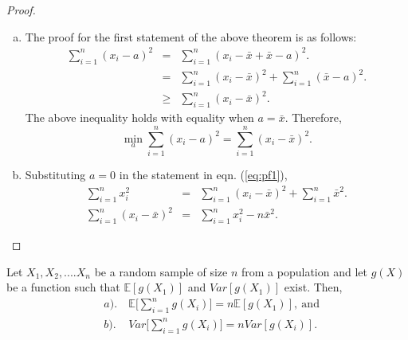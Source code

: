 \documentclass[a4paper,english,12pt]{article}
\begin{document}
\begin{proof}
\begin{enumerate}[a)]
\item{ 
The proof for the first statement of the above theorem is as follows:
\begin{eqnarray} \label{eq:pf1}
\sum_{i=1}^{n} (x_i - a)^2 &=& \sum_{i=1}^{n} (x_i - \bar{x} + \bar{x} - a)^2. \nonumber \\
&=& \sum_{i=1}^{n} (x_i - \bar{x})^2 + \sum_{i=1}^{n} (\bar{x} - a)^2.  \\ \nonumber
&\geq& \sum_{i=1}^{n} (x_i - \bar{x})^2.
\end{eqnarray}
The above inequality holds with equality when $a = \bar{x}$. Therefore,
\begin{equation}
 \min_{a} \sum_{i=1}^{n} (x_i - a)^2 = \sum_{i=1}^{n} (x_i - \bar{x})^2.
\end{equation}
}
\item{
Substituting $a = 0$ in the statement in eqn. (\ref{eq:pf1}),
\begin{eqnarray}
\sum_{i=1}^{n} x_i^2 &=& \sum_{i=1}^{n} (x_i - \bar{x})^2 + \sum_{i=1}^{n} \bar{x}^2.  \nonumber \\
\sum_{i=1}^{n} (x_i - \bar{x})^2 &=& \sum_{i=1}^{n} x_i^2 - n \bar{x}^2.
\end{eqnarray}
}
\end{enumerate}
\end{proof}
\begin{lem}
Let $X_1, X_2, .... X_n$ be a random sample of size $n$ from a population and let $g(X)$ be a function such that $\mathbb{E}[g(X_{1})]$ and $Var[g(X_{1})]$ exist. Then,
\begin{eqnarray}
&a).& ~\mathbb{E}\Big[ \sum_{i=1}^{n} g(X_i) \Big] = n \mathbb{E}[g(X_1)],~\mbox{and}\\
&b).& ~Var \Big[ \sum_{i=1}^{n} g(X_i) \Big] = n Var[g(X_i)].
\end{eqnarray}
\end{lem}
\end{document}
